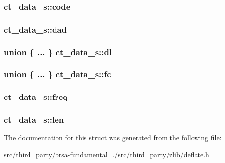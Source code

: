 \subsubsection[{code}]{ ct\+\_\+data\+\_\+s\+::code}\label{structct__data__s_a242f709ab288db2d155e28ce98c510c5}
\hypertarget{structct__data__s_a73955d00dbdac5ad4027804a00726bfa}{}
\subsubsection[{dad}]{ ct\+\_\+data\+\_\+s\+::dad}\label{structct__data__s_a73955d00dbdac5ad4027804a00726bfa}
\hypertarget{structct__data__s_ad148c8eddd237b011ffcd2d569a4cc94}{}
\subsubsection[{dl}]{\setlength{\rightskip}{0pt plus 5cm}union \{ ... \}   ct\+\_\+data\+\_\+s\+::dl}\label{structct__data__s_ad148c8eddd237b011ffcd2d569a4cc94}
\hypertarget{structct__data__s_ab7571b35d9adc3adbd54a477d6bd3af3}{}
\subsubsection[{fc}]{\setlength{\rightskip}{0pt plus 5cm}union \{ ... \}   ct\+\_\+data\+\_\+s\+::fc}\label{structct__data__s_ab7571b35d9adc3adbd54a477d6bd3af3}
\hypertarget{structct__data__s_a67cd3c3267ba768c4494b36d5929c4bf}{}
\subsubsection[{freq}]{ ct\+\_\+data\+\_\+s\+::freq}\label{structct__data__s_a67cd3c3267ba768c4494b36d5929c4bf}
\hypertarget{structct__data__s_ad7f6929b2907e046dfbc8f091b494cfb}{}
\subsubsection[{len}]{ ct\+\_\+data\+\_\+s\+::len}\label{structct__data__s_ad7f6929b2907e046dfbc8f091b494cfb}


The documentation for this struct was generated from the following file\+:\begin{DoxyCompactItemize}
\item 
src/third\+\_\+party/orsa-\/fundamental\+\_./src/third\+\_\+party/zlib/\hyperlink{deflate_8h}{deflate.\+h}\end{DoxyCompactItemize}
